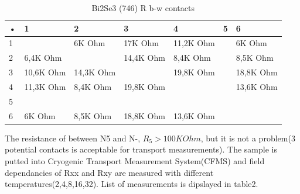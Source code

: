 \documentclass[idxtotoc,hyperref,openany,oneside]{labbook} %
\begin{document}
\begin{table}[H]
\begin{tabular}{l l l l l l l}
\toprule
\textbf{•} & \textbf{1} & \textbf{2} & \textbf{3}& \textbf{4}& \textbf{5}& \textbf{6}\\
\toprule
 1&   & 6K Ohm & 17K Ohm & 11,2K Ohm &  & 6K Ohm\\
 2 & 6,4K Ohm &  &14,4K Ohm & 8,4K Ohm &  &8,5K Ohm\\
 3 & 10,6K Ohm & 14,3K Ohm & & 19,8K Ohm &  & 18,8K Ohm\\
 4 & 11,3K Ohm & 8,4K Ohm &19,8K Ohm &  &  & 13,6K Ohm\\
 5 &  &  &  &  &  \\
 6 & 6K Ohm & 8,5K Ohm &18,8K Ohm &13,6K Ohm &  &\\
\bottomrule
\end{tabular}
\caption{Bi2Se3 (746) R b-w contacts}
\label{tab:Bi2Se3 (746) R b-w contacts}
\end{table}
The resistance of between N5 and N-, $R_5>100K Ohm$, but it is not a problem(3 potential contacts is acceptable for transport measurements).
The sample is putted into Cryogenic Transport Measurement System(CFMS) and field dependancies of Rxx and Rxy are measured with different temperatures(2,4,8,16,32).
List of measurements is dipslayed in  table2.
\end{document}
